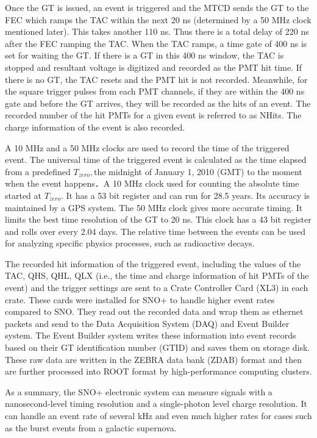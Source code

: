Once the GT is issued, an event is triggered and the MTCD sends the GT to the FEC which ramps the TAC within the next 20 ns (determined by a 50 MHz clock mentioned later). This takes another 110 ns. Thus there is a total delay of 220 ns after the FEC ramping the TAC. When the TAC ramps, a time gate of 400 ns is set for waiting the GT. If there is a GT in this 400 ns window, the TAC is stopped and resultant voltage is digitized and recorded as the PMT hit time. If there is no GT, the TAC resets and the PMT hit is not recorded. Meanwhile, for the square trigger pulses from each PMT channels, if they are within the 400 ns gate and before the GT arrives, they will be recorded as the hits of an event. The recorded number of the hit PMTs for a given event is referred to as NHits. The charge information of the event is also recorded\cite{stringer2019sensitivity,rattime}.

A 10 MHz and a 50 MHz clocks are used to record the time of the triggered event. The universal time of the triggered event is calculated as the time elapsed from a predefined $T_{zero}, $the midnight of January 1, 2010 (GMT) to the moment when the event happens．A 10 MHz clock used for counting the absolute time started at $T_{zero}$. It has a 53 bit register and can run for 28.5 years. Its accuracy is maintained by a GPS system. The 50 MHz clock gives more accurate timing. It limits the best time resolution of the GT to 20 ns. This clock has a 43 bit register and rolls over every 2.04 days. The relative time between the events can be used for analyzing specific physics processes, such as radioactive decays\cite{rattime,stringer2019sensitivity}. 

The recorded hit information of the triggered event, including the values of the TAC, QHS, QHL, QLX (i.e., the time and charge information of hit PMTs of the event) and the trigger settings are sent to a Crate Controller Card (XL3) in each crate. These cards were installed for SNO+ to handle higher event rates compared to SNO. They read out the recorded data and wrap them as ethernet packets and send to the Data Acquisition System (DAQ) and Event Builder system\cite{walker2016study}. The Event Builder system writes these information into event records based on their GT identification number (GTID) and saves them on storage disk\cite{snop_nim}. These raw data are written in the ZEBRA data bank (ZDAB) format and then are further processed into ROOT format by high-performance computing clusters.

As a summary, the SNO+ electronic system can measure signals with a nanosecond-level timing resolution and a single-photon level charge resolution. It can handle an event rate of several kHz and even much higher rates for cases such as the burst events from a galactic supernova\cite{snop_nim}.

